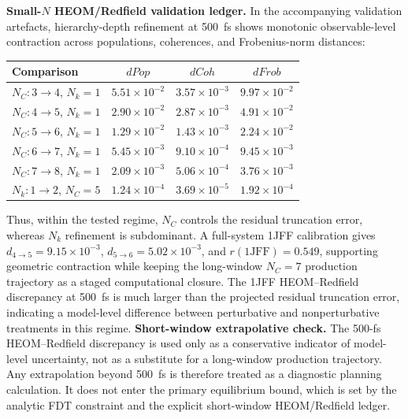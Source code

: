 \documentclass[twocolumn,10pt]{article}
\begin{document}
\textbf{Small-$N$ HEOM/Redfield validation ledger.}
In the accompanying validation artefacts, hierarchy-depth refinement at
500~fs shows monotonic observable-level contraction across populations,
coherences, and Frobenius-norm distances:
\begin{center}
\footnotesize
\begin{tabular}{lccc}
\toprule
Comparison & $dPop$ & $dCoh$ & $dFrob$ \\
\midrule
$N_C:3\to4$, $N_k=1$ & $5.51\times10^{-2}$ & $3.57\times10^{-3}$ & $9.97\times10^{-2}$ \\
$N_C:4\to5$, $N_k=1$ & $2.90\times10^{-2}$ & $2.87\times10^{-3}$ & $4.91\times10^{-2}$ \\
$N_C:5\to6$, $N_k=1$ & $1.29\times10^{-2}$ & $1.43\times10^{-3}$ & $2.24\times10^{-2}$ \\
$N_C:6\to7$, $N_k=1$ & $5.45\times10^{-3}$ & $9.10\times10^{-4}$ & $9.45\times10^{-3}$ \\
$N_C:7\to8$, $N_k=1$ & $2.09\times10^{-3}$ & $5.06\times10^{-4}$ & $3.76\times10^{-3}$ \\
$N_k:1\to2$, $N_C=5$ & $1.24\times10^{-4}$ & $3.69\times10^{-5}$ & $1.92\times10^{-4}$ \\
\bottomrule
\end{tabular}
\end{center}
Thus, within the tested regime, $N_C$ controls the residual truncation error,
whereas $N_k$ refinement is subdominant. A full-system 1JFF calibration gives
$d_{4\to5}=9.15\times10^{-3}$, $d_{5\to6}=5.02\times10^{-3}$, and
$r(1\text{JFF})=0.549$, supporting geometric contraction while keeping the
long-window $N_C=7$ production trajectory as a staged computational closure. 
The 1JFF HEOM--Redfield discrepancy at 500~fs is much larger than the projected residual
truncation error, indicating a model-level difference between perturbative and
nonperturbative treatments in this regime. 
\textbf{Short-window extrapolative check.} The 500-fs HEOM--Redfield discrepancy is used only as a conservative indicator of model-level uncertainty, not as a substitute for a long-window production trajectory. Any extrapolation beyond 500~fs is therefore treated as a diagnostic planning calculation. It does not enter the primary equilibrium bound, which is set by the analytic FDT constraint and the explicit short-window HEOM/Redfield ledger.
\end{document}
